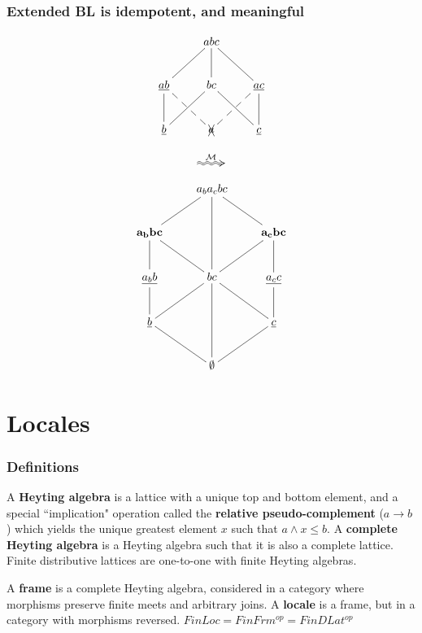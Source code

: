 \documentclass{beamer}
\newcommand{\Mcc}{\mathcal{M}}
\begin{document}
\begin{frame}
\frametitle{Extended BL is idempotent, and meaningful}
\begin{figure}
\begin{minipage}[c]{0.4\textwidth}
\begin{equation*}
    \xymatrix{& abc \ar@{-}[dl] \ar@{-}[d] \ar@{-}[dr] & \\
      \underline{ab} \ar@{-}[d] \ar@{--}[dr] & bc \ar@{-}[dl] \ar@{-}[dr] &
        \underline{ac} \ar@{-}[d] \ar@{--}[dl] \\
        \underline{b} & \xcancel{a}  & \underline{c} }
\end{equation*}
\end{minipage}
\begin{minipage}[c]{0.08\textwidth}
  \begin{equation*}
    \xymatrix{\ar@2{~>}[r]^{\Mcc} &}
  \end{equation*}
\end{minipage}
\begin{minipage}[c]{0.4\textwidth}
\begin{equation*}
    \xymatrix{& a_ba_cbc \ar@{-}[dl] \ar@{-}[dd] \ar@{-}[dr] & \\
      \mathbf{a_bbc} \ar@{-}[d] \ar@{-}[dr] & &
        \mathbf{a_cbc} \ar@{-}[d] \ar@{-}[dl]\\
        \underline{a_bb} \ar@{-}[d] & bc \ar@{-}[dl] \ar@{-}[dd] \ar@{-}[dr] &
          \underline{a_cc} \ar@{-}[d] \\
         \underline{b} \ar@{-}[dr] & & \underline{c} \ar@{-}[dl] \\
      & \mathbf{\emptyset} }
\end{equation*}
\end{minipage}
\end{figure}
\end{frame}

\section{Locales}
\begin{frame}
\frametitle{Definitions}
A \textbf{Heyting algebra} is a lattice with a unique top and bottom element, and a special ``implication" operation called the \textbf{relative pseudo-complement} (\(a \rightarrow b\)) which yields the unique greatest element \(x\) such that \(a \wedge x \le b\). A \textbf{complete Heyting algebra} is a Heyting algebra such that it is also a complete lattice. Finite distributive lattices are one-to-one with finite Heyting algebras.

A \textbf{frame} is a complete Heyting algebra, considered in a category where morphisms preserve finite meets and arbitrary joins. A \textbf{locale} is a frame, but in a category with morphisms reversed. \(FinLoc = FinFrm^{op} = FinDLat^{op}\)
\end{frame}
\end{document}
